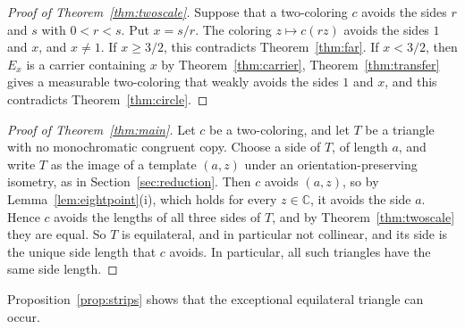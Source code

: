 \documentclass[10pt]{article}
\theoremstyle{remark}
\newcommand{\C}{\mathbb C}
\begin{document}
\begin{proof}[Proof of Theorem~\ref{thm:twoscale}]
Suppose that a two-coloring $c$ avoids the sides $r$ and $s$ with $0<r<s$. Put $x=s/r$. The coloring $z\mapsto c(rz)$ avoids the sides $1$ and $x$, and $x\ne1$. If $x\ge3/2$, this contradicts Theorem~\ref{thm:far}. If $x<3/2$, then $E_x$ is a carrier containing $x$ by Theorem~\ref{thm:carrier}, Theorem~\ref{thm:transfer} gives a measurable two-coloring that weakly avoids the sides $1$ and $x$, and this contradicts Theorem~\ref{thm:circle}.
\end{proof}

\begin{proof}[Proof of Theorem~\ref{thm:main}]
Let $c$ be a two-coloring, and let $T$ be a triangle with no monochromatic congruent copy. Choose a side of $T$, of length $a$, and write $T$ as the image of a template $(a,z)$ under an orientation-preserving isometry, as in Section~\ref{sec:reduction}. Then $c$ avoids $(a,z)$, so by Lemma~\ref{lem:eightpoint}(i), which holds for every $z\in\C$, it avoids the side $a$. Hence $c$ avoids the lengths of all three sides of $T$, and by Theorem~\ref{thm:twoscale} they are equal. So $T$ is equilateral, and in particular not collinear, and its side is the unique side length that $c$ avoids. In particular, all such triangles have the same side length.
\end{proof}

Proposition~\ref{prop:strips} shows that the exceptional equilateral triangle can occur.
\end{document}
